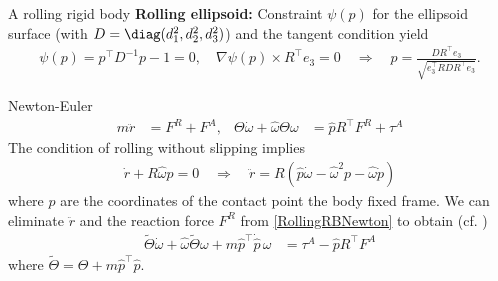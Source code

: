 \begin{Example}{A rolling rigid body}
\textbf{Rolling ellipsoid:}
Constraint $\psi(p)$ for the ellipsoid surface (with $D = \diag (d_1^2, d_2^2, d_3^2)$) and the tangent condition yield
\begin{align}
 \psi(p) = p^\top D^{-1} p - 1 = 0,
\quad
 \nabla \psi(p) \times R^\top e_3 = 0
\quad \Rightarrow \quad
 p = \frac{D R^\top e_3}{\sqrt{e_3^\top R D R^\top e_3}}.
\end{align}
\end{Example}

Newton-Euler
\begin{align}\label{RollingRBNewton}
 m \ddot{r} &= F^R + F^A,&
 \Theta \dot{\omega} + \widehat{\omega}\Theta \omega &= \widehat{p} R^\top F^R + \tau^A
\end{align}
The condition of rolling without slipping implies
\begin{align}
 \dot{r} + R \widehat{\omega} p = 0
\quad \Rightarrow \quad
 \ddot{r} = R (\widehat{p} \dot{\omega} - \widehat{\omega}^2 p - \widehat{\omega} \dot{p})
\end{align}
where $p$ are the coordinates of the contact point \wrt the body fixed frame.
We can eliminate $\ddot{r}$ and the reaction force $F^R$ from \eqref{RollingRBNewton} to obtain (cf. \cite{Borisov:RollingRB})
\begin{align}
 \tilde{\Theta} \dot{\omega} + \widehat{\omega} \tilde{\Theta} \omega + m \widehat{p}^\top \dot{\widehat{p}} \, \omega &= \tau^A - \widehat{p} R^\top F^A
\end{align}
where $\tilde{\Theta} = \Theta + m \widehat{p}^\top \widehat{p}$.
